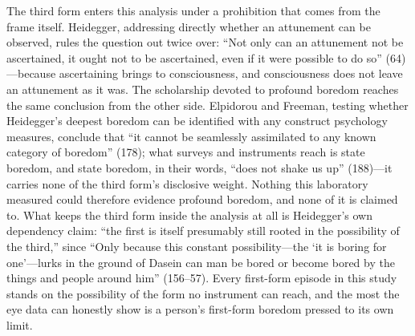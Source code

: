 The third form enters this analysis under a prohibition that comes from the frame itself.
Heidegger, addressing directly whether an attunement can be observed, rules the question out
twice over: ``Not only can an attunement not be ascertained, it ought not to be ascertained,
even if it were possible to do so'' (64)---because ascertaining brings to consciousness, and
consciousness does not leave an attunement as it was. The scholarship devoted to profound
boredom reaches the same conclusion from the other side. Elpidorou and Freeman, testing
whether Heidegger's deepest boredom can be identified with any construct psychology measures,
conclude that ``it cannot be seamlessly assimilated to any known category of boredom'' (178);
what surveys and instruments reach is state boredom, and state boredom, in their words, ``does
not shake us up'' (188)---it carries none of the third form's disclosive weight. Nothing this
laboratory measured could therefore evidence profound boredom, and none of it is claimed to.
What keeps the third form inside the analysis at all is Heidegger's own dependency claim:
``the first is itself presumably still rooted in the possibility of the third,'' since ``Only
because this constant possibility---the `it is boring for one'---lurks in the ground of Dasein
can man be bored or become bored by the things and people around him'' (156--57). Every
first-form episode in this study stands on the possibility of the form no instrument can
reach, and the most the eye data can honestly show is a person's first-form boredom pressed
to its own limit.

